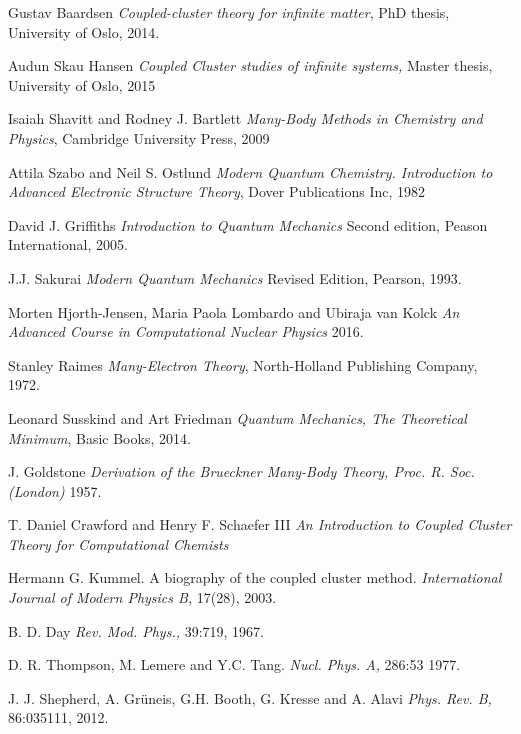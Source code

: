 \documentclass[twoside,english]{uiofysmaster}
\begin{document}
\begin{thebibliography}{9}

	Gustav Baardsen
	\textit{Coupled-cluster theory for infinite matter}, PhD thesis, University of Oslo, 2014.

	Audun Skau Hansen
	\textit{Coupled Cluster studies of infinite systems,} Master thesis, University of Oslo, 2015

	Isaiah Shavitt and Rodney J. Bartlett
	\textit{Many-Body Methods in Chemistry and Physics}, Cambridge University Press, 2009

	Attila Szabo and Neil S. Ostlund
	\textit{Modern Quantum Chemistry. Introduction to Advanced Electronic Structure Theory}, Dover Publications Inc, 1982

	David J. Griffiths
	\textit{Introduction to Quantum Mechanics} Second edition, Peason International, 2005.

	J.J. Sakurai
	\textit{Modern Quantum Mechanics} Revised Edition, Pearson, 1993.

	Morten Hjorth-Jensen, Maria Paola Lombardo and Ubiraja van Kolck
	\textit{An Advanced Course in Computational Nuclear Physics} 2016.

	Stanley Raimes
	\textit{Many-Electron Theory}, North-Holland Publishing Company, 1972.

	Leonard Susskind and Art Friedman
	\textit{Quantum Mechanics, The Theoretical Minimum}, Basic Books, 2014.

	J. Goldstone
	\textit{Derivation of the Brueckner Many-Body Theory, Proc. R. Soc. (London)} 1957. 

	T. Daniel Crawford and Henry F. Schaefer III
	\textit{An Introduction to Coupled Cluster Theory for Computational Chemists} 

	Hermann G. Kummel. A biography of the coupled cluster method. 
	\textit{International Journal of Modern Physics B,} 17(28), 2003. 

	B. D. Day
	\textit{Rev. Mod. Phys.,}
	39:719, 1967.

	D. R. Thompson, M. Lemere and Y.C. Tang.
	\textit{Nucl. Phys. A,} 286:53 1977.

	J. J. Shepherd, A. Grüneis, G.H. Booth, G. Kresse and A. Alavi 
	\textit{Phys. Rev. B,} 86:035111, 2012.


\end{thebibliography}
\end{document}
